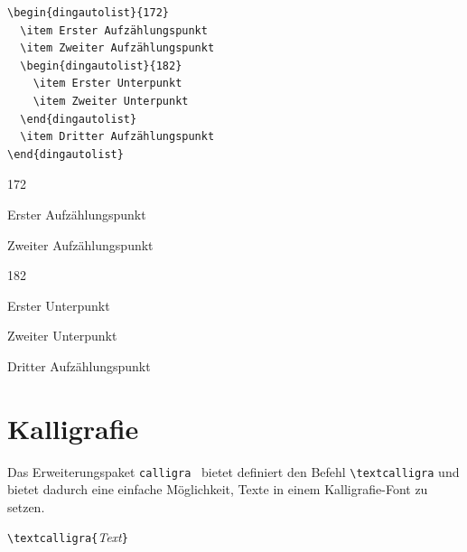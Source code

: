 \documentclass[a4paper,10pt,twoside]{scrbook}
\begin{document}
\begin{minipage}[h]{0.5\textwidth}
\setlength{\parskip}{1em}
\frenchspacing
\begin{Verbatim}[frame=single]
\begin{dingautolist}{172}
  \item Erster Aufzählungspunkt
  \item Zweiter Aufzählungspunkt
  \begin{dingautolist}{182}
    \item Erster Unterpunkt
    \item Zweiter Unterpunkt
  \end{dingautolist}
  \item Dritter Aufzählungspunkt
\end{dingautolist}
\end{Verbatim}
\end{minipage}
\hfill
\begin{minipage}[h]{0.48\textwidth}
\setlength{\parskip}{1em}
\frenchspacing
\begin{dingautolist}{172}
  \item Erster Aufzählungspunkt
  \item Zweiter Aufzählungspunkt
  \begin{dingautolist}{182}
    \item Erster Unterpunkt
    \item Zweiter Unterpunkt
  \end{dingautolist}
  \item Dritter Aufzählungspunkt
\end{dingautolist}
\end{minipage}


\section{Kalligrafie}

Das Erweiterungspaket \verb!calligra!~\cite{Calligra_Dokumentation} bietet definiert den Befehl 
\verb!\textcalligra!
und bietet dadurch eine einfache Möglichkeit, Texte in einem 
Kalligrafie-Font zu setzen.


\begin{boxedminipage}{\textwidth}
\texttt{\textbackslash textcalligra\{}\textsl{Text}\texttt{\}}
\end{boxedminipage}
\end{document}
